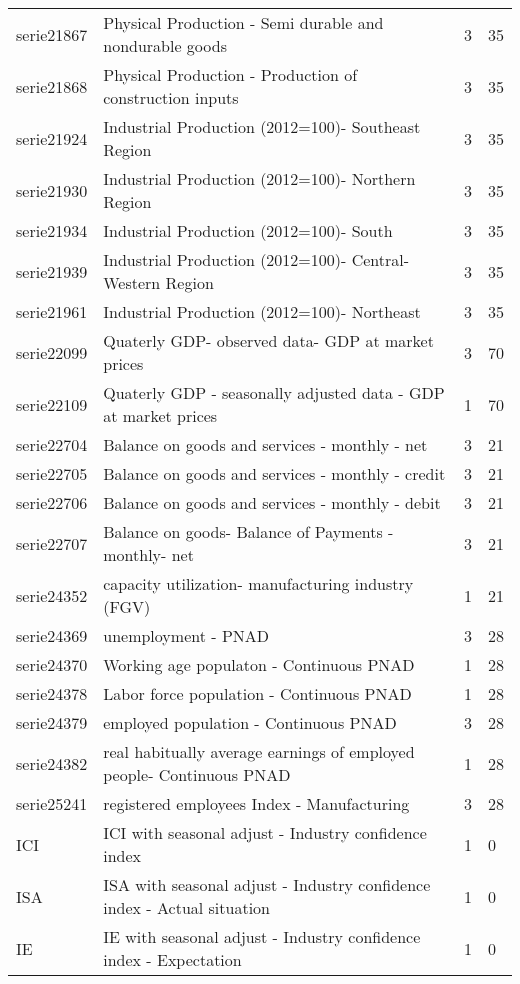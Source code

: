 \documentclass{article}
\begin{document}
\begin{landscape}
\begin{center}
\begin{longtable}{|l|l|l|l|}
serie21867 & Physical Production - Semi durable and nondurable goods & 3 & 35 \\
serie21868 & Physical Production - Production of construction inputs & 3 & 35 \\
serie21924 & Industrial Production (2012=100)- Southeast Region & 3 & 35 \\
serie21930 & Industrial Production (2012=100)- Northern Region & 3 & 35 \\
serie21934 & Industrial Production (2012=100)- South & 3 & 35 \\
serie21939 & Industrial Production (2012=100)- Central- Western Region & 3 & 35 \\
serie21961 & Industrial Production (2012=100)- Northeast & 3 & 35 \\
serie22099 & Quaterly GDP- observed data- GDP at market prices & 3 & 70 \\
serie22109 & Quaterly GDP - seasonally adjusted data - GDP at market prices & 1 & 70 \\
serie22704 & Balance on goods and services - monthly - net & 3 & 21 \\
serie22705 & Balance on goods and services - monthly - credit & 3 & 21 \\
serie22706 & Balance on goods and services - monthly - debit & 3 & 21 \\
serie22707 & Balance on goods- Balance of Payments - monthly- net & 3 & 21 \\
serie24352 & capacity utilization- manufacturing industry (FGV) & 1 & 21 \\
serie24369 & unemployment - PNAD & 3 & 28 \\
serie24370 & Working age populaton - Continuous PNAD & 1 & 28 \\
serie24378 & Labor force population - Continuous PNAD & 1 & 28 \\
serie24379 & employed population - Continuous PNAD & 3 & 28 \\
serie24382 & real habitually average earnings of employed people- Continuous PNAD & 1 & 28 \\
serie25241 & registered employees Index - Manufacturing & 3 & 28 \\
ICI & ICI with seasonal adjust - Industry confidence index & 1 & 0 \\
ISA & ISA with seasonal adjust - Industry confidence index - Actual situation & 1 & 0 \\
IE & IE with seasonal adjust - Industry confidence index - Expectation & 1 & 0 \\

\end{longtable}
\end{center}
\end{landscape}
\end{document}
